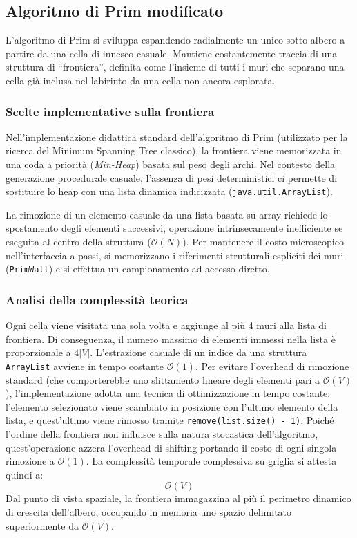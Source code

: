 \documentclass[12pt, a4paper]{article}
\begin{document}
	\subsection{Algoritmo di Prim modificato}
	L'algoritmo di Prim si sviluppa espandendo radialmente un unico sotto-albero a partire da una cella di innesco casuale. Mantiene costantemente traccia di una struttura di ``frontiera'', definita come l'insieme di tutti i muri che separano una cella già inclusa nel labirinto da una cella non ancora esplorata.
	
	\subsubsection{Scelte implementative sulla frontiera}
	Nell'implementazione didattica standard dell'algoritmo di Prim (utilizzato per la ricerca del Minimum Spanning Tree classico), la frontiera viene memorizzata in una coda a priorità (\textit{Min-Heap}) basata sul peso degli archi. Nel contesto della generazione procedurale casuale, l'assenza di pesi deterministici ci permette di sostituire lo heap con una lista dinamica indicizzata (\texttt{java.util.ArrayList}). 
	
	La rimozione di un elemento casuale da una lista basata su array richiede lo spostamento degli elementi successivi, operazione intrinsecamente inefficiente se eseguita al centro della struttura ($\mathcal{O}(N)$). Per mantenere il costo microscopico nell'interfaccia a passi, si memorizzano i riferimenti strutturali espliciti dei muri (\texttt{PrimWall}) e si effettua un campionamento ad accesso diretto.
	
	\subsubsection{Analisi della complessità teorica}
	Ogni cella viene visitata una sola volta e aggiunge al più 4 muri alla lista di frontiera. Di conseguenza, il numero massimo di elementi immessi nella lista è proporzionale a $4|V|$. 
	L’estrazione casuale di un indice da una struttura \texttt{ArrayList} avviene in tempo costante $\mathcal{O}(1)$. Per evitare l'overhead di rimozione standard (che comporterebbe uno slittamento lineare degli elementi pari a $\mathcal{O}(V)$), l'implementazione adotta una tecnica di ottimizzazione in tempo costante: l'elemento selezionato viene scambiato in posizione con l'ultimo elemento della lista, e quest'ultimo viene rimosso tramite \texttt{remove(list.size() - 1)}. Poiché l'ordine della frontiera non influisce sulla natura stocastica dell'algoritmo, quest'operazione azzera l'overhead di shifting portando il costo di ogni singola rimozione a $\mathcal{O}(1)$. La complessità temporale complessiva su griglia si attesta quindi a:
	$$\mathcal{O}(V)$$
	Dal punto di vista spaziale, la frontiera immagazzina al più il perimetro dinamico di crescita dell'albero, occupando in memoria uno spazio delimitato superiormente da $\mathcal{O}(V)$.
	
\end{document}

